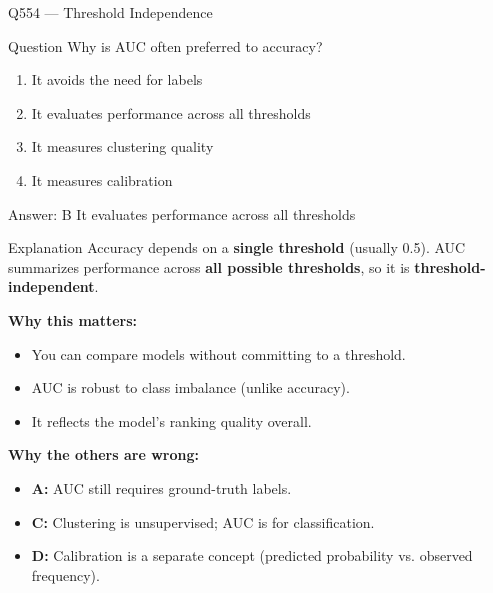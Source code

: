 \documentclass[aspectratio=169,8pt]{beamer}
\begin{document}
	\begin{frame}{Q554 --- Threshold Independence}
		\begin{block}{Question}
			Why is AUC often preferred to accuracy?
			\begin{enumerate}
				\item It avoids the need for labels
				\item It evaluates performance across all thresholds
				\item It measures clustering quality
				\item It measures calibration
			\end{enumerate}
		\end{block}
		
		\begin{exampleblock}{Answer: B}
			It evaluates performance across all thresholds
		\end{exampleblock}
		
		\begin{block}{Explanation}
			Accuracy depends on a \textbf{single threshold} (usually 0.5). AUC summarizes
			performance across \textbf{all possible thresholds}, so it is
			\textbf{threshold-independent}.
			
			\textbf{Why this matters:}
			\begin{itemize}
				\item You can compare models without committing to a threshold.
				\item AUC is robust to class imbalance (unlike accuracy).
				\item It reflects the model's ranking quality overall.
			\end{itemize}
			
			\textbf{Why the others are wrong:}
			\begin{itemize}
				\item \textbf{A:} AUC still requires ground-truth labels.
				\item \textbf{C:} Clustering is unsupervised; AUC is for classification.
				\item \textbf{D:} Calibration is a separate concept (predicted probability
				vs. observed frequency).
			\end{itemize}
		\end{block}
	\end{frame}
	
\end{document}
